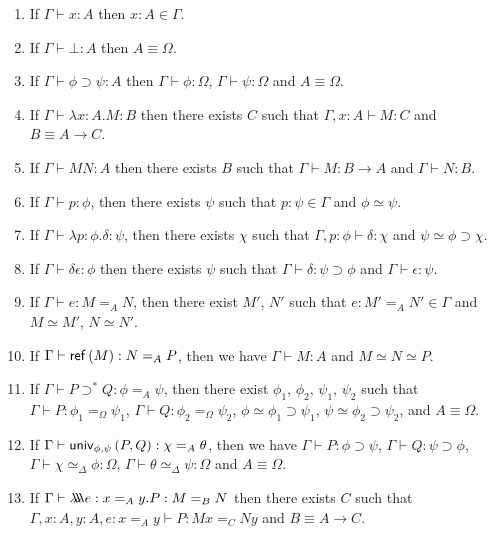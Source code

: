 \begin{lemma}[Generation]
$ $
\begin{enumerate}
\item
If $\Gamma \vdash x : A$ then $x : A \in \Gamma$.
\item
If $\Gamma \vdash \bot : A$ then $A \equiv \Omega$.
\item
If $\Gamma \vdash \phi \supset \psi : A$ then $\Gamma \vdash \phi : \Omega$, $\Gamma \vdash \psi : \Omega$ and $A \equiv \Omega$.
\item
If $\Gamma \vdash \lambda x:A.M : B$ then there exists $C$ such that $\Gamma, x : A \vdash M : C$ and $B \equiv A \rightarrow C$.
\item
If $\Gamma \vdash MN : A$ then there exists $B$ such that $\Gamma \vdash M : B \rightarrow A$ and $\Gamma \vdash N : B$.
\item
If $\Gamma \vdash p : \phi$, then there exists $\psi$ such that $p : \psi \in \Gamma$ and $\phi \simeq \psi$.
\item
If $\Gamma \vdash \lambda p:\phi.\delta : \psi$, then there exists $\chi$ such that $\Gamma, p : \phi \vdash \delta : \chi$ and $\psi \simeq \phi \supset \chi$.
\item
If $\Gamma \vdash \delta \epsilon : \phi$ then there exists $\psi$ such that $\Gamma \vdash \delta : \psi \supset \phi$ and $\Gamma \vdash \epsilon : \psi$.
\item
If $\Gamma \vdash e : M =_A N$, then there exist $M'$, $N'$ such that $e : M' =_A N' \in \Gamma$ and $M \simeq M'$, $N \simeq N'$.
\item
If $\Gamma \vdash \mathsf{ref} \left( {M} \right) : N =_A P$, then we have $\Gamma \vdash M : A$ and $M \simeq N \simeq P$.
\item
If $\Gamma \vdash P \supset^* Q : \phi =_A \psi$, then there exist $\phi_1$, $\phi_2$, $\psi_1$, $\psi_2$ such that
$\Gamma \vdash P : \phi_1 =_\Omega \psi_1$, $\Gamma \vdash Q : \phi_2 =_\Omega \psi_2$, $\phi \simeq \phi_1 \supset \psi_1$, $\psi \simeq \phi_2 \supset \psi_2$, and $A \equiv \Omega$.
\item
If $\Gamma \vdash \mathsf{univ}_{{\phi} , {\psi}} \left( {P} , {Q} \right) : \chi =_A \theta$, then we have $\Gamma \vdash P : \phi \supset \psi$, $\Gamma \vdash Q : \psi \supset \phi$,
$\Gamma \vdash \chi \simeq_\Delta \phi : \Omega$, $\Gamma \vdash \theta \simeq_\Delta \psi : \Omega$ and $A \equiv \Omega$.
\item
If $\Gamma \vdash \lambda \!\! \lambda \!\! \lambda e : x =_A y. P : M =_B N$ then there exists $C$ such that $\Gamma, x : A, y : A, e : x =_A y \vdash P : M x =_C N y$
and $B \equiv A \rightarrow C$.

\end{enumerate}
\end{lemma}
